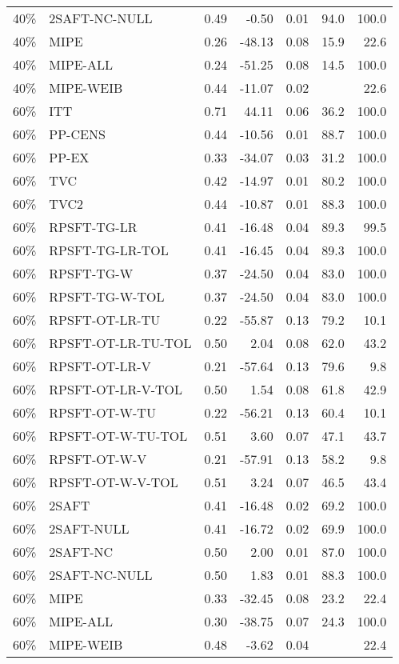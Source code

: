 \begin{table}[ht]
{\begin{tabular}{llrrrrr}
  40\% & 2SAFT-NC-NULL & 0.49 & -0.50 & 0.01 & 94.0 & 100.0 \\ 
  40\% & MIPE & 0.26 & -48.13 & 0.08 & 15.9 & 22.6 \\ 
  40\% & MIPE-ALL & 0.24 & -51.25 & 0.08 & 14.5 & 100.0 \\ 
  40\% & MIPE-WEIB & 0.44 & -11.07 & 0.02 &  & 22.6 \\ 
   \hline
60\% & ITT & 0.71 & 44.11 & 0.06 & 36.2 & 100.0 \\ 
  60\% & PP-CENS & 0.44 & -10.56 & 0.01 & 88.7 & 100.0 \\ 
  60\% & PP-EX & 0.33 & -34.07 & 0.03 & 31.2 & 100.0 \\ 
  60\% & TVC & 0.42 & -14.97 & 0.01 & 80.2 & 100.0 \\ 
  60\% & TVC2 & 0.44 & -10.87 & 0.01 & 88.3 & 100.0 \\ 
   \hline
60\% & RPSFT-TG-LR & 0.41 & -16.48 & 0.04 & 89.3 & 99.5 \\ 
  60\% & RPSFT-TG-LR-TOL & 0.41 & -16.45 & 0.04 & 89.3 & 100.0 \\ 
  60\% & RPSFT-TG-W & 0.37 & -24.50 & 0.04 & 83.0 & 100.0 \\ 
  60\% & RPSFT-TG-W-TOL & 0.37 & -24.50 & 0.04 & 83.0 & 100.0 \\ 
  60\% & RPSFT-OT-LR-TU & 0.22 & -55.87 & 0.13 & 79.2 & 10.1 \\ 
  60\% & RPSFT-OT-LR-TU-TOL & 0.50 & 2.04 & 0.08 & 62.0 & 43.2 \\ 
  60\% & RPSFT-OT-LR-V & 0.21 & -57.64 & 0.13 & 79.6 & 9.8 \\ 
  60\% & RPSFT-OT-LR-V-TOL & 0.50 & 1.54 & 0.08 & 61.8 & 42.9 \\ 
   \hline
60\% & RPSFT-OT-W-TU & 0.22 & -56.21 & 0.13 & 60.4 & 10.1 \\ 
  60\% & RPSFT-OT-W-TU-TOL & 0.51 & 3.60 & 0.07 & 47.1 & 43.7 \\ 
  60\% & RPSFT-OT-W-V & 0.21 & -57.91 & 0.13 & 58.2 & 9.8 \\ 
  60\% & RPSFT-OT-W-V-TOL & 0.51 & 3.24 & 0.07 & 46.5 & 43.4 \\ 
   \hline
60\% & 2SAFT & 0.41 & -16.48 & 0.02 & 69.2 & 100.0 \\ 
  60\% & 2SAFT-NULL & 0.41 & -16.72 & 0.02 & 69.9 & 100.0 \\ 
  60\% & 2SAFT-NC & 0.50 & 2.00 & 0.01 & 87.0 & 100.0 \\ 
  60\% & 2SAFT-NC-NULL & 0.50 & 1.83 & 0.01 & 88.3 & 100.0 \\ 
  60\% & MIPE & 0.33 & -32.45 & 0.08 & 23.2 & 22.4 \\ 
  60\% & MIPE-ALL & 0.30 & -38.75 & 0.07 & 24.3 & 100.0 \\ 
  60\% & MIPE-WEIB & 0.48 & -3.62 & 0.04 &  & 22.4 \\ 
   \hline
\end{tabular}
}
\end{table}
